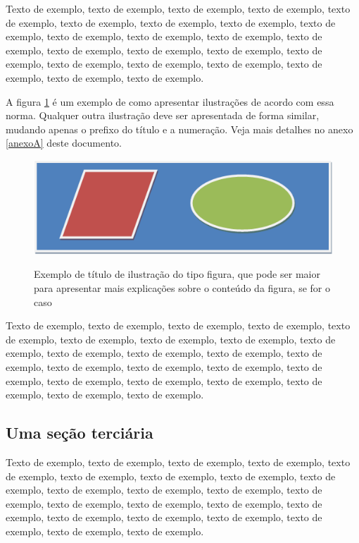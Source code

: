 \documentclass[
	12pt,				%
	oneside,			%
	a4paper,			%
	english,			%
	brazil				%
	]{abntex2ppgsi}
\begin{document}
Texto de exemplo, texto de exemplo, texto de exemplo, texto de exemplo, texto de exemplo, texto de exemplo, texto de exemplo, texto de exemplo, texto de exemplo, texto de exemplo, texto de exemplo, texto de exemplo, texto de exemplo, texto de exemplo, texto de exemplo, texto de exemplo, texto de exemplo, texto de exemplo, texto de exemplo, texto de exemplo, texto de exemplo, texto de exemplo, texto de exemplo.

A figura \ref{fig:figura-exemplo2} é um exemplo de como apresentar ilustrações de acordo com essa norma. Qualquer outra ilustração deve ser apresentada de forma similar, mudando apenas o prefixo do título e a numeração. Veja mais detalhes no anexo \ref{anexoA} deste documento.

\begin{figure}[htbp]
	\centering
  \caption{Exemplo de título de ilustração do tipo figura, que pode ser maior para apresentar mais explicações sobre o conteúdo da figura, se for o caso}
		\includegraphics{figura-exemplo.png}
	\label{fig:figura-exemplo2}
\end{figure}

Texto de exemplo, texto de exemplo, texto de exemplo, texto de exemplo, texto de exemplo, texto de exemplo, texto de exemplo, texto de exemplo, texto de exemplo, texto de exemplo, texto de exemplo, texto de exemplo, texto de exemplo, texto de exemplo, texto de exemplo, texto de exemplo, texto de exemplo, texto de exemplo, texto de exemplo, texto de exemplo, texto de exemplo, texto de exemplo, texto de exemplo.

\subsection{Uma seção terciária}

Texto de exemplo, texto de exemplo, texto de exemplo, texto de exemplo, texto de exemplo, texto de exemplo, texto de exemplo, texto de exemplo, texto de exemplo, texto de exemplo, texto de exemplo, texto de exemplo, texto de exemplo, texto de exemplo, texto de exemplo, texto de exemplo, texto de exemplo, texto de exemplo, texto de exemplo, texto de exemplo, texto de exemplo, texto de exemplo, texto de exemplo.
\end{document}
